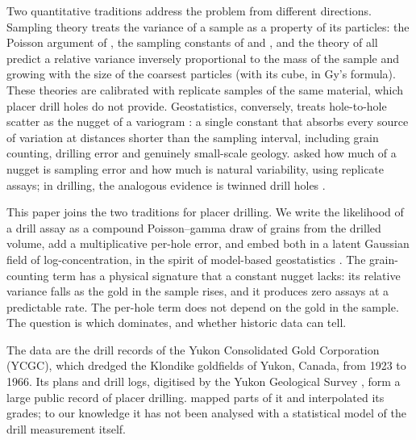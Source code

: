 \documentclass[11pt,a4paper]{article}
\theoremstyle{remark}
\begin{document}
Two quantitative traditions address the problem from different directions. Sampling theory treats the variance of a sample as a property of its particles: the Poisson argument of \citet{Clifton1969}, the sampling constants of \citet{Ingamells1973} and \citet{Ingamells1981}, and the theory of \citet{Gy1979} all predict a relative variance inversely proportional to the mass of the sample and growing with the size of the coarsest particles (with its cube, in Gy's formula). These theories are calibrated with replicate samples of the same material, which placer drill holes do not provide. Geostatistics, conversely, treats hole-to-hole scatter as the nugget of a variogram \citep{Matheron1963,Journel1978}: a single constant that absorbs every source of variation at distances shorter than the sampling interval, including grain counting, drilling error and genuinely small-scale geology. \citet{Clark2010} asked how much of a nugget is sampling error and how much is natural variability, using replicate assays; in drilling, the analogous evidence is twinned drill holes \citep{Abzalov2009}.

This paper joins the two traditions for placer drilling. We write the likelihood of a drill assay as a compound Poisson--gamma draw of grains from the drilled volume, add a multiplicative per-hole error, and embed both in a latent Gaussian field of log-concentration, in the spirit of model-based geostatistics \citep{Diggle1998,Diggle2007}. The grain-counting term has a physical signature that a constant nugget lacks: its relative variance falls as the gold in the sample rises, and it produces zero assays at a predictable rate. The per-hole term does not depend on the gold in the sample. The question is which dominates, and whether historic data can tell.

The data are the drill records of the Yukon Consolidated Gold Corporation (YCGC), which dredged the Klondike goldfields of Yukon, Canada, from 1923 to 1966. Its plans and drill logs, digitised by the Yukon Geological Survey \citep{vanLoon2016,vanLoon2017,YGS2020}, form a large public record of placer drilling. \citet{vanLoon2016,vanLoon2017} mapped parts of it and interpolated its grades; to our knowledge it has not been analysed with a statistical model of the drill measurement itself.
\end{document}
